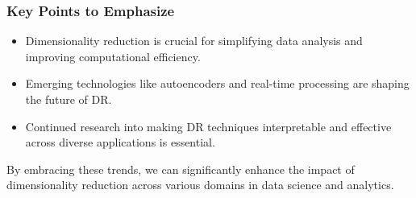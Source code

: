 \documentclass[aspectratio=169]{beamer}
\begin{document}
\begin{frame}[fragile]
    \frametitle{Key Points to Emphasize}

    \begin{itemize}
        \item Dimensionality reduction is crucial for simplifying data analysis and improving computational efficiency.
        \item Emerging technologies like autoencoders and real-time processing are shaping the future of DR.
        \item Continued research into making DR techniques interpretable and effective across diverse applications is essential.
    \end{itemize}

    By embracing these trends, we can significantly enhance the impact of dimensionality reduction across various domains in data science and analytics.
\end{frame}
\end{document}
